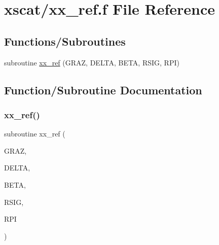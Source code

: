 \hypertarget{xx__ref_8f}{}\section{xscat/xx\+\_\+ref.f File Reference}
\label{xx__ref_8f}
\subsection*{Functions/\+Subroutines}
\begin{DoxyCompactItemize}
\item 
subroutine \hyperlink{xx__ref_8f_a1684f0b4b23e5ecf679d99316c4d6c5c}{xx\+\_\+ref} (G\+R\+AZ, D\+E\+L\+TA, B\+E\+TA, R\+S\+IG, R\+PI)
\end{DoxyCompactItemize}


\subsection{Function/\+Subroutine Documentation}
\mbox{\label{xx__ref_8f_a1684f0b4b23e5ecf679d99316c4d6c5c}} 
\subsubsection{\texorpdfstring{xx\+\_\+ref()}{xx\_ref()}}
{\footnotesize\ttfamily subroutine xx\+\_\+ref (\begin{DoxyParamCaption}\item[{}]{G\+R\+AZ,  }\item[{}]{D\+E\+L\+TA,  }\item[{}]{B\+E\+TA,  }\item[{}]{R\+S\+IG,  }\item[{}]{R\+PI }\end{DoxyParamCaption})}

